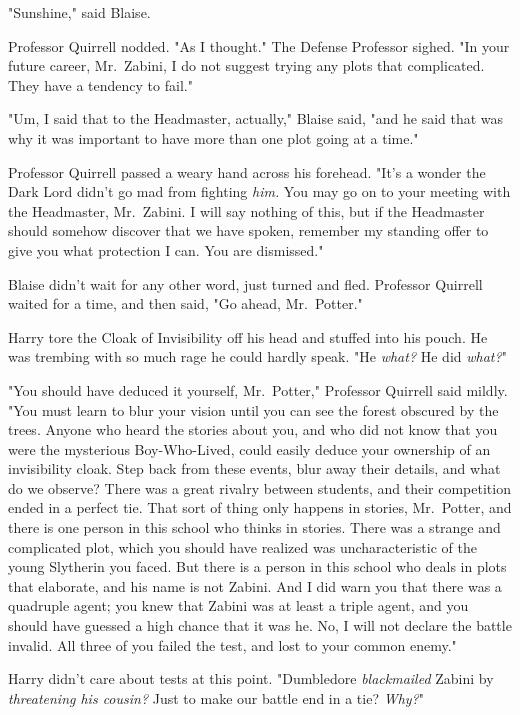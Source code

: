 "Sunshine," said Blaise.

Professor Quirrell nodded. "As I thought." The Defense Professor sighed. "In 
your future career, Mr.~Zabini, I do not suggest trying any plots that 
complicated. They have a tendency to fail."

"Um, I said that to the Headmaster, actually," Blaise said, "and he said that 
was why it was important to have more than one plot going at a time."

Professor Quirrell passed a weary hand across his forehead. "It's a wonder the 
Dark Lord didn't go mad from fighting \emph{him.} You may go on to your meeting 
with the Headmaster, Mr.~Zabini. I will say nothing of this, but if the 
Headmaster should somehow discover that we have spoken, remember my standing 
offer to give you what protection I can. You are dismissed."

Blaise didn't wait for any other word, just turned and fled.
\sbreak
Professor Quirrell waited for a time, and then said, "Go ahead, Mr.~Potter."

Harry tore the Cloak of Invisibility off his head and stuffed into his pouch. 
He was trembing with so much rage he could hardly speak. "He \emph{what?} He 
did \emph{what?}"

"You should have deduced it yourself, Mr.~Potter," Professor Quirrell said 
mildly. "You must learn to blur your vision until you can see the forest 
obscured by the trees. Anyone who heard the stories about you, and who did not 
know that you were the mysterious Boy-Who-Lived, could easily deduce your 
ownership of an invisibility cloak. Step back from these events, blur away 
their details, and what do we observe? There was a great rivalry between 
students, and their competition ended in a perfect tie. That sort of thing only 
happens in stories, Mr.~Potter, and there is one person in this school who 
thinks in stories. There was a strange and complicated plot, which you should 
have realized was uncharacteristic of the young Slytherin you faced. But there 
is a person in this school who deals in plots that elaborate, and his name is 
not Zabini. And I did warn you that there was a quadruple agent; you knew that 
Zabini was at least a triple agent, and you should have guessed a high chance 
that it was he. No, I will not declare the battle invalid. All three of you 
failed the test, and lost to your common enemy."

Harry didn't care about tests at this point. "Dumbledore \emph{blackmailed} 
Zabini by \emph{threatening his cousin?} Just to make our battle end in a tie? 
\emph{Why?}"

